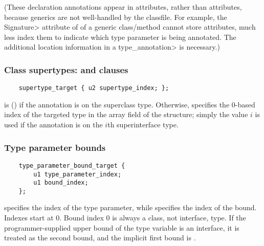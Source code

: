 \documentclass[10pt]{article}
\newcommand{\preverbnegspace}{\vspace{-5pt}}
\begin{document}
(These declaration annotations appear in 
\RuntimeInOrVisibleTypeAnnotations attributes, rather than 
\RuntimeInOrVisibleAnnotations attributes, because generics are not
well-handled by the classfile.  For example, the \<Signature> attribute of
of a generic class/method cannot store attributes, much less index them to
indicate which type parameter is being annotated.  The additional location
information in a \<type\_annotation> is necessary.)


\subsubsection{Class supertypes:   and  clauses\label{class-file:ext:ri:extends}}


\preverbnegspace
\begin{Verbatim}
    supertype_target { u2 supertype_index; };
\end{Verbatim}

 is  () if the annotation is on the
superclass type.  Otherwise,  specifies the 0-based index of the
targeted type in the
 array field of the  structure;
simply the value $i$ is used if the annotation is on the $i$th
superinterface type.



\subsubsection{Type parameter bounds\label{class-file:ext:ri:tpbound}}


\preverbnegspace
\begin{Verbatim}
    type_parameter_bound_target {
        u1 type_parameter_index;
        u1 bound_index;
    };
\end{Verbatim}

 specifies the index of the type parameter, while
 specifies the index of the bound.  Indexes start at 0.
Bound index 0 is always a class, not interface, type.
If the programmer-supplied upper bound of the type variable is an
interface, it is treated as the second bound, and the implicit first bound
is .
\end{document}
